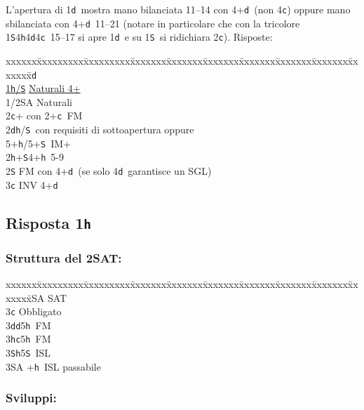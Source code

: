 \documentclass[a4paper,italian]{article}
\newcommand{\BS}{\small{\texttt{S}}}
\newcommand{\BC}{\small{\texttt{c}}}
\newcommand{\BD}{\small{\texttt{d}}}
\newcommand{\BH}{\small{\texttt{h}}}
\newcommand{\pdfh}{\texorpdfstring{\texttt{h}}{H}}
\newenvironment{bidtable}
{\begin{tabbing}

    xxxxxx\=xxxxxxxxx\=xxxxxxxxx\=xxxxxxx\=xxxxxxx\=xxxxxxx\=xxxxxxx\=xxxxxxx\=xxxxxxx\=xxxxxxx\=\kill}
{\end{tabbing} }%
\begin{document}
\begin{multicols}{2}
    L'apertura di 1\BD\ mostra mano bilanciata 11--14 con 4+\BD\ (non 4\BC ) oppure mano sbilanciata con 4+\BD\ 11--21 (notare in particolare che con la tricolore 1\BS 4\BH 4\BD 4\BC\ 15--17  si apre 1\BD\ e su 1\BS\ si ridichiara 2\BC ).
    Risposte:
    \begin{bidtable}
        1\BD\+\\
        \hyperref[fissaggi]{1\BH/\BS} \> \hyperref[fissaggi]{Naturali 4+}\\
        1/2\small{SA} \> Naturali\\
        2\BC {}+ con 2+\BC\ FM\\
        2\BD {}\BH /\BS\ con requisiti di sottoapertura oppure\+\\5+\BH /5+\BS\ IM+\-\\
        2\BH {}+\BS 4+\BH\ 5-9\\
        2\BS \> FM con 4+\BD\ (se solo 4\BD\ garantisce un SGL)\\
        3\BC \> INV 4+\BD \-
    \end{bidtable}
    \bigbreak

    \subsection{Risposta 1\pdfh}

    \subsubsection{Struttura del 2SAT:}

    \begin{bidtable}
        2\small{SA} \small{SA}T\+\\
        3\BC \> Obbligato\+\\
        3\BD {}\BD 5\BH\ FM\\
        3\BH {}\BC 5\BH\ FM\\
        3\BS {}\BH 5\BS\ ISL\\
        3\small{SA} +\BH\ ISL passabile\-\-
    \end{bidtable}

    \subsubsection{Sviluppi:}


\end{multicols}
\end{document}
